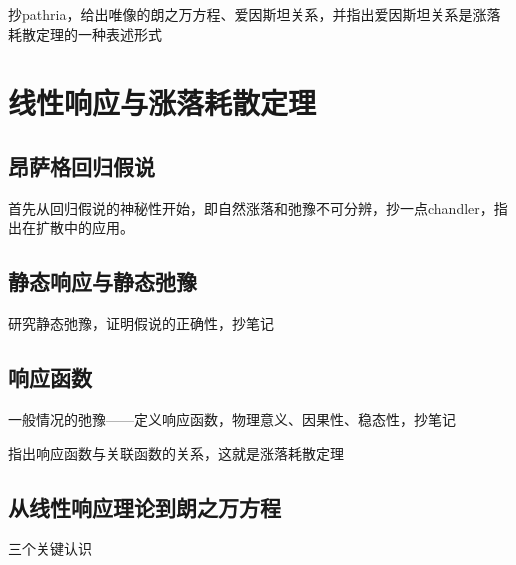 抄pathria，给出唯像的朗之万方程、爱因斯坦关系，并指出爱因斯坦关系是涨落耗散定理的一种表述形式

\section{线性响应与涨落耗散定理}

\subsection{昂萨格回归假说}

首先从回归假说的神秘性开始，即自然涨落和弛豫不可分辨，抄一点chandler，指出在扩散中的应用。

\subsection{静态响应与静态弛豫}

研究静态弛豫，证明假说的正确性，抄笔记

\subsection{响应函数}

一般情况的弛豫——定义响应函数，物理意义、因果性、稳态性，抄笔记

指出响应函数与关联函数的关系，这就是涨落耗散定理

\subsection{从线性响应理论到朗之万方程}

三个关键认识

